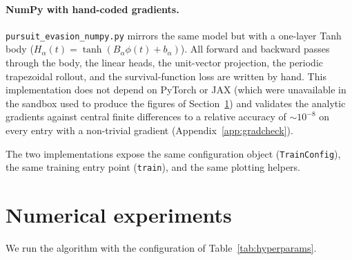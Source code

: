\documentclass[11pt]{article}
\begin{document}
\paragraph{NumPy with hand-coded gradients.}
\texttt{pursuit\_evasion\_numpy.py} mirrors the same model but with a
one-layer Tanh body
($H_\alpha(t) = \tanh(B_\alpha\phi(t) + b_\alpha)$).  All forward and
backward passes through the body, the linear heads, the unit-vector
projection, the periodic trapezoidal rollout, and the survival-function
loss are written by hand.  This implementation does not depend on
PyTorch or JAX (which were unavailable in the sandbox used to produce
the figures of Section~\ref{sec:experiments}) and validates the
analytic gradients against central finite differences to a relative
accuracy of $\sim 10^{-8}$ on every entry with a non-trivial gradient
(Appendix~\ref{app:gradcheck}).

The two implementations expose the same configuration object
(\texttt{TrainConfig}), the same training entry point (\texttt{train}),
and the same plotting helpers.

\section{Numerical experiments}
\label{sec:experiments}
We run the algorithm with the configuration of
Table~\ref{tab:hyperparams}.
\end{document}
